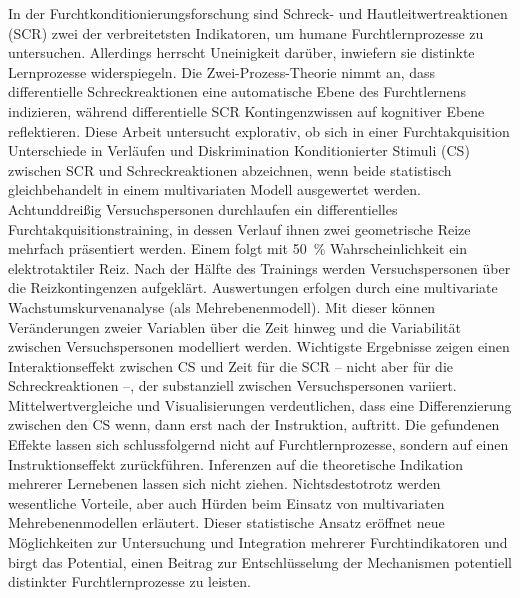 

\noindent 
 	In der Furchtkonditionierungsforschung sind Schreck- und Hautleitwertreaktionen (SCR) zwei der verbreitetsten Indikatoren, um  humane Furchtlernprozesse zu untersuchen. Allerdings herrscht Uneinigkeit darüber, inwiefern sie distinkte Lernprozesse widerspiegeln. Die Zwei-Prozess-Theorie nimmt an, dass differentielle Schreckreaktionen eine automatische Ebene des Furchtlernens indizieren, während differentielle SCR Kontingenzwissen auf kognitiver Ebene reflektieren.
	Diese Arbeit untersucht explorativ, ob sich in einer Furchtakquisition Unterschiede in Verläufen und Diskrimination Konditionierter Stimuli (CS) zwischen SCR und Schreckreaktionen abzeichnen, wenn beide statistisch gleichbehandelt in einem multivariaten Modell ausgewertet werden. 
	Achtunddreißig Versuchspersonen durchlaufen ein differentielles %
	Furchtakquisitionstraining, in dessen Verlauf ihnen zwei geometrische Reize mehrfach präsentiert werden. Einem folgt mit \SI{50}{\percent} Wahrscheinlichkeit ein elektrotaktiler Reiz. Nach der Hälfte des Trainings werden Versuchspersonen über die Reizkontingenzen aufgeklärt.
	Auswertungen erfolgen durch eine multivariate Wachstumskurvenanalyse (als Mehrebenenmodell). Mit dieser können Veränderungen zweier Variablen über die Zeit hinweg und die Variabilität zwischen Versuchspersonen modelliert werden. 		
	Wichtigste Ergebnisse zeigen einen Interaktionseffekt zwischen CS und Zeit für die SCR -- nicht aber für die Schreckreaktionen --, der substanziell zwischen Versuchspersonen variiert. Mittelwertvergleiche und Visualisierungen verdeutlichen, dass eine Differenzierung zwischen den CS wenn, dann erst nach der Instruktion, auftritt.	
	Die gefundenen Effekte lassen sich schlussfolgernd nicht auf Furchtlernprozesse, sondern auf einen Instruktionseffekt zurückführen. Inferenzen auf die theoretische Indikation mehrerer Lernebenen lassen sich nicht ziehen.		
	Nichtsdestotrotz werden wesentliche Vorteile, aber auch Hürden beim Einsatz von multivariaten Mehrebenenmodellen erläutert. 
	Dieser statistische Ansatz eröffnet neue Möglichkeiten zur Untersuchung und Integration mehrerer Furchtindikatoren und birgt das Potential, einen Beitrag zur Entschlüsselung der Mechanismen potentiell distinkter Furchtlernprozesse zu leisten.
	
